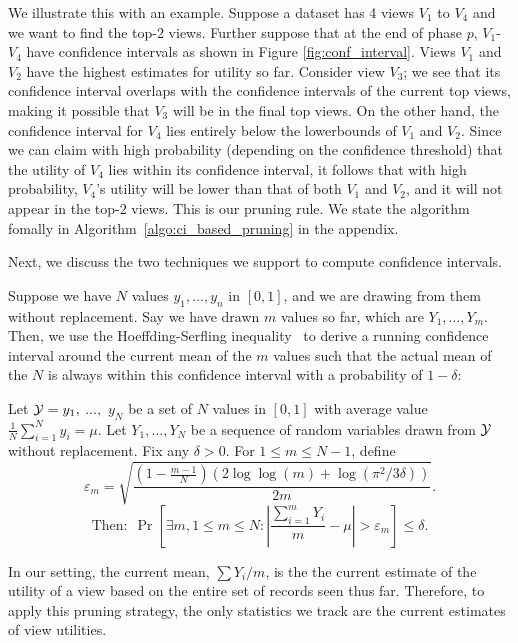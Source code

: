 We illustrate this with an example. Suppose a dataset has 4 views $V_1$
to $V_4$ and we want to find the top-$2$ views.
Further suppose that at the end of phase $p$,
$V_1$-$V_4$ have confidence intervals as shown in Figure \ref{fig:conf_interval}.
Views $V_1$ and $V_2$ have the highest estimates for utility so far.
Consider view $V_3$; we see that its confidence interval overlaps with the
confidence intervals of the current top views, making it possible
that $V_3$ will be in the final top views. On the other hand, the confidence
interval for $V_4$ lies entirely below the lowerbounds of $V_1$ and $V_2$.
Since we can claim with high probability (depending on the confidence threshold)
that the utility of $V_4$ lies within its confidence interval, it follows that
with high probability, $V_4$'s utility will be lower than that of both $V_1$ and
$V_2$, and it will not appear in the top-$2$ views.
This is our pruning rule. 
We state the algorithm fomally in
Algorithm~\ref{algo:ci_based_pruning} in the appendix.

Next, we discuss the two techniques we support to compute confidence intervals.


Suppose we have $N$ values $y_1, \ldots, y_n$ in $[0, 1]$, and we are drawing
from them without replacement. 
Say we have drawn $m$ values so far, which are $Y_1, \ldots, Y_m$.
Then, we use the Hoeffding-Serfling inequality~\cite{serfling1974probability} 
to derive a running 
confidence interval around the current mean 
of the $m$ values such that the actual mean of the $N$
is always within this confidence interval with a probability of $1 - \delta$:
\begin{theorem}
\label{thm:hs}
Let $\mathcal{Y} = y_1,$ $\ldots,$ $y_N$ be a set of $N$ 
values in $[0,1]$ with average value
$\frac1N \sum_{i=1}^N y_i = \mu$.
Let $Y_1,\ldots,Y_N$ be a 
sequence of random variables drawn from $\mathcal{Y}$ without
replacement.
Fix any $\delta > 0$. For $1 \le m \le N-1$, define
$$
\varepsilon_m = \sqrt{\frac{(1-\frac{m-1}N)(2\log \log (m) + \log(\pi^2/3\delta))}{2m}}.
$$
$$
\textrm{Then:} \ \   \Pr\left[ \exists m, 1 \le m \le N : 
  \left|\frac{\sum_{i=1}^m Y_i}{m} - \mu\right| > \varepsilon_m \right] 
\le \delta.
$$
\end{theorem}
In our setting, the current mean, $\sum Y_i / m$, is the 
the current estimate of the utility of a view 
based on the entire set of records seen thus far. 
Therefore, to apply this pruning strategy, the only statistics
we track are the current estimates of view utilities.

